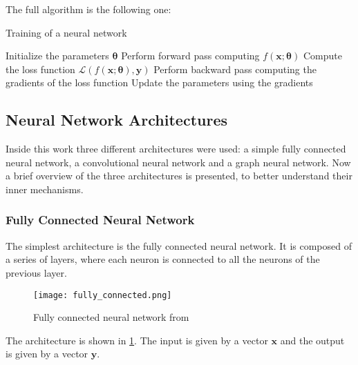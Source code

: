 The full algorithm is the following one:
\begin{algorithm} 
    \caption{Training of a neural network}
    \begin{algorithmic}
        \State Initialize the parameters \( \bm{\theta} \)
                \State Perform forward pass computing \( f(\bm{x}; \bm{\theta}) \)
                \State Compute the loss function \( \mathcal{L}(f(\bm{x}; \bm{\theta}), \bm{y}) \)
                \State Perform backward pass computing the gradients of the loss function
                \State Update the parameters using the gradients
            \EndFor
        \EndWhile
    \end{algorithmic}
\end{algorithm}

\subsection{Neural Network Architectures}
Inside this work three different architectures were used: a simple fully connected neural network, a convolutional neural network and a graph neural network. Now a brief overview of the three architectures is presented, to better understand their inner mechanisms.

\subsubsection{Fully Connected Neural Network}
The simplest architecture is the fully connected neural network. It is composed of a series of layers, where each neuron is connected to all the neurons of the previous layer. 
\begin{figure}
    \centering
    \texttt{[image: fully\_connected.png]}
    \caption{Fully connected neural network from \cite{tonello2019machinelearningtipstricks}}
    \label{fig:fully_connected}
\end{figure}
The architecture is shown in \cref{fig:fully_connected}. The input is given by a vector \( \bm{x} \) and the output is given by a vector \( \bm{y} \). 
        